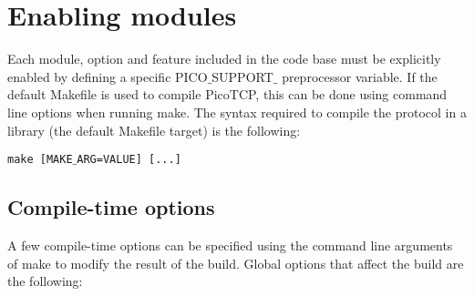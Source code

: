 \section{Enabling modules}
Each module, option and feature included in the code base must be explicitly
enabled by defining a specific PICO$\_$SUPPORT$\_$ preprocessor variable.
If the default Makefile is used to compile PicoTCP, this can be done using
command line options when running make. The syntax required to compile the
protocol in a library (the default Makefile target) is the following:

\texttt{make [MAKE$\_$ARG=VALUE] [...] }

\subsection{Compile-time options}
A few compile-time options can be specified using the command line
arguments of make to modify the result of the build. Global options that
affect the build are the following:

